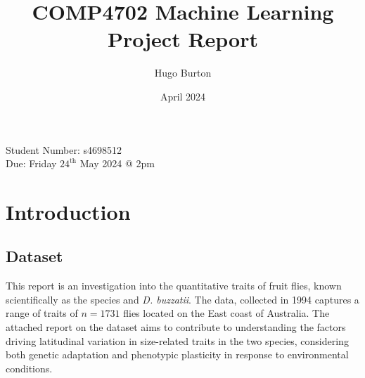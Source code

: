 \documentclass{article}
\title{COMP4702 Machine Learning Project Report}
\author{Hugo Burton}
\date{April 2024}
\begin{document}
\maketitle
\thispagestyle{fancy}

\newcommand{\PP}{\mathbb{P}}
\newcommand{\cc}{^{\mathsf{c}}}

\newcommand{\A}{\ensuremath{\mathbb{A}}}
\newcommand{\C}{\ensuremath{\mathbb{C}}}
\newcommand{\E}{\ensuremath{\mathbb{E}}}
\newcommand{\I}{\ensuremath{\mathbb{I}}}
\newcommand{\J}{\ensuremath{\mathbb{J}}}
\newcommand{\N}{\ensuremath{\mathbb{N}}}
\newcommand{\pr}{\ensuremath{\mathbb{P}}}
\newcommand{\Q}{\ensuremath{\mathbb{Q}}}
\newcommand{\R}{\ensuremath{\mathbb{R}}}
\newcommand{\T}{\ensuremath{\mathbb{T}}}
\newcommand{\X}{\ensuremath{\mathbb{X}}}

\newcommand{\qed}{\hfill\blacksquare}

\newcommand{\scriptG}{\mathcal{G}}
\newcommand{\scriptN}{\mathcal{N}}
\newcommand{\scriptI}{\mathcal{I}}
\newcommand{\scriptL}{\mathcal{L}}
\newcommand{\scriptR}{\mathcal{R}}

\newcommand{\var}{\text{Var}}

\newcommand{\bs}[1]{\boldsymbol{#1}} %
\newcommand{\dif}[1]{\text{d#1}}
\newcommand{\ddx}{\frac{\text{d}}{\dif{x}}}

\newcommand{\ito}{\ensuremath{\text{It}\hat{\text{o}}}}

\noindent
Student Number: s4698512\\
Due: Friday $24^{\text{th}}$ May 2024 @ 2pm

\section{Introduction}

\subsection{Dataset}

This report is an investigation into the quantitative traits of fruit flies, known scientifically as the species  and \textit{D. buzzatii}. The data, collected in 1994 captures a range of traits of $n = 1731$ flies located on the East coast of Australia. The attached report on the dataset aims to contribute to understanding the factors driving latitudinal variation in size-related traits in the two species, considering both genetic adaptation and phenotypic plasticity in response to environmental conditions.
\end{document}

